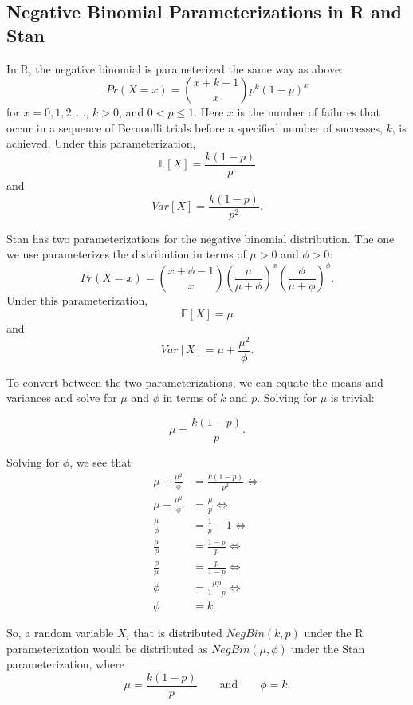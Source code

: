 \documentclass[10pt,a4paper]{article}
\begin{document}
\subsection*{Negative Binomial Parameterizations in R and Stan}

In R, the negative binomial is parameterized the same way as above:
\[
	Pr(X = x) = \binom{x + k - 1}{x} p^k (1-p)^x
\]
for $x = 0, 1, 2, \ldots$, $k > 0$, and $0 < p \leq 1$. Here $x$ is the number of failures that occur in a sequence of Bernoulli trials before a specified number of successes, $k$, is achieved. Under this parameterization,
\[
	\mathbb{E}[X] = \frac{k (1-p)}{p}
\]
and
\[
	Var[X] = \frac{k (1-p)}{p^2}.
\]

Stan has two parameterizations for the negative binomial distribution. The one we use parameterizes the distribution in terms of $\mu > 0$ and $\phi > 0$:
\[
	Pr(X = x) = \binom{x + \phi - 1}{x} \left( \frac{\mu}{\mu + \phi} \right)^x  \left( \frac{\phi}{\mu + \phi} \right)^{\phi}.
\]
Under this parameterization,
\[
	\mathbb{E}[X] = \mu
\]
and
\[
	Var[X] = \mu + \frac{\mu^2}{\phi}.
\]

To convert between the two parameterizations, we can equate the means and variances and solve for $\mu$ and $\phi$ in terms of $k$ and $p$. Solving for $\mu$ is trivial:

\[
	\mu = \frac{k (1-p)}{p}.
\]

Solving for $\phi$, we see that
\begin{align*}
	\mu + \frac{\mu^2}{\phi} &= \frac{k (1-p)}{p^2} \Longleftrightarrow \\[3pt]
	\mu + \frac{\mu^2}{\phi} &= \frac{\mu}{p} \Longleftrightarrow \\[3pt]
	\frac{\mu}{\phi} &= \frac{1}{p} - 1 \Longleftrightarrow \\[3pt]
	\frac{\mu}{\phi} &= \frac{1-p}{p} \Longleftrightarrow \\[3pt]
	\frac{\phi}{\mu} &= \frac{p}{1-p} \Longleftrightarrow \\[3pt]
	\phi &= \frac{\mu p }{1-p} \Longleftrightarrow \\[3pt]
	\phi &= k.
\end{align*}

So, a random variable $X_i$ that is distributed $NegBin(k, p)$ under the R parameterization would be distributed as $NegBin(\mu, \phi)$ under the Stan parameterization, where
\[
	\mu = \frac{k(1-p)}{p} \quad\quad \text{and} \quad\quad \phi = k.
\]
\end{document}
